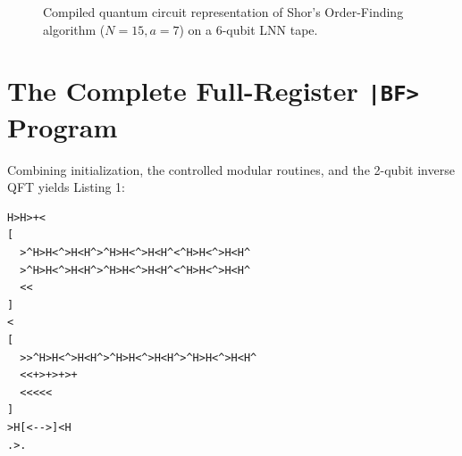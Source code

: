 \documentclass[11pt,a4paper,twocolumn]{article}
\begin{document}
\begin{figure}[t]
{%
}
\caption{Compiled quantum circuit representation of Shor's Order-Finding algorithm ($N = 15, a = 7$) on a 6-qubit LNN tape.}
\label{fig:shor_circuit}
\end{figure}

\section{The Complete Full-Register \texttt{|BF>} Program}

Combining initialization, the controlled modular routines, and the 2-qubit inverse QFT yields Listing 1:

\begin{lstlisting}[caption={Complete \texttt{|BF>} program for Shor's Algorithm ($N = 15, a = 7$).}]
H>H>+<
[
  >^H>H<^>H<H^>^H>H<^>H<H^<^H>H<^>H<H^
  >^H>H<^>H<H^>^H>H<^>H<H^<^H>H<^>H<H^
  <<
]
<
[
  >>^H>H<^>H<H^>^H>H<^>H<H^>^H>H<^>H<H^
  <<+>+>+>+
  <<<<<
]
>H[<-->]<H
.>.
\end{lstlisting}
\end{document}
